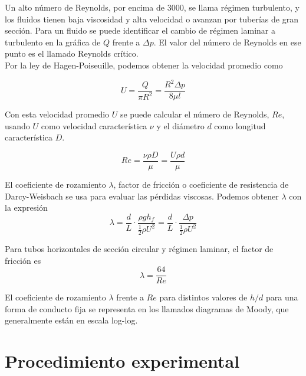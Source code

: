 \documentclass[a4paper,12pt,spanish]{article}
\begin{document}
	Un alto número de Reynolds, por encima de 3000, se llama régimen turbulento, y los fluidos tienen baja viscosidad y alta velocidad o avanzan por tuberías de gran sección. Para un fluido se puede identificar el cambio de régimen laminar a turbulento en la gráfica de $Q$ frente a $\mathit{\Delta}p$. El valor del número de Reynolds en ese punto es el llamado Reynolds crítico.\\
	
	
	Por la ley de Hagen-Poiseuille, podemos obtener la velocidad promedio como
	
	\[U = \frac{Q}{\pi R^2} = \frac{R^2 \mathit{\Delta} p}{8\mu l}\]
	
	Con esta velocidad promedio $U$ se puede calcular el número de Reynolds, $Re$, usando $U$ como velocidad característica $\nu$ y el diámetro $d$ como longitud característica $D$.
	
	\[Re = \frac{\nu \rho D}{\mu}= \frac{U \rho d}{\mu}\] 
	
	\vspace{\baselineskip}
	
	El coeficiente de rozamiento $\lambda$, factor de fricción o coeficiente de resistencia de Darcy-Weisbach se usa para evaluar las pérdidas viscosas. Podemos obtener $\lambda$ con la expresión
	\[\lambda = \frac{d}{L} \cdot \frac{\rho g h_f}{\frac{1}{2} \rho U^2} = \frac{d}{L} \cdot \frac{\mathit{\Delta}p}{\frac{1}{2} \rho U^2}\]
	
	Para tubos horizontales de sección circular y régimen laminar, el factor de fricción es 
	\[\lambda = \frac{64}{Re}\]
	
	El coeficiente de rozamiento $\lambda$ frente a $Re$ para distintos valores de $h/d$ para una forma de conducto fija se representa en los llamados diagramas de Moody, que generalmente están en escala log-log.
	
	
	
	\section{Procedimiento experimental}
	
\end{document}
